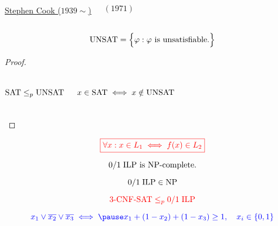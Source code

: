 \begin{frame}
  \begin{center}
  \end{center}

  \begin{columns}
	  \begin{center}
		\href{https://en.wikipedia.org/wiki/Stephen\_Cook}{Stephen Cook ($1939 \sim$)}
	  \end{center}
	  \begin{center}
		\href{http://www.cs.toronto.edu/~sacook/homepage/1971.pdf}{$(1971)$}
	  \end{center}
  \end{columns}
\end{frame}

\begin{frame}
  \[
	\text{UNSAT} = \Big\{ \varphi: \varphi \text{ is unsatisfiable.} \Big\}
  \]

  \begin{center}
  \end{center}

  \pause
  \begin{proof}
	\begin{columns}
		\pause
		\[
		  \text{SAT} \le_{p} \text{UNSAT}
		\]

		\pause
		\[
		  x \in \text{SAT} \iff x \notin \text{UNSAT}
		\]
		\pause
	\end{columns}
  \end{proof}

  \pause
  \[
	\textcolor{red}{\boxed{\forall x: x \in L_1 \iff f(x) \in L_2}}
  \]
\end{frame}

% 

\begin{frame}
  \begin{theorem}[CLRS $34.5$-$2$]
	\[
	  0/1\; \text{ILP}{} \text{ is NP-complete.}
	\]
  \end{theorem}

  \pause
  \[
	0/1\; \text{ILP}{} \in \text{NP}
  \]

  \pause
  \[
	\textcolor{red}{3\text{-CNF-SAT} \le_{p} 0/1\; \text{ILP}}
  \]

  \pause
  \[
	\blue{x_1 \lor \overline{x_2} \lor \overline{x_3} \iff \pause x_1 + (1-x_2) + (1-x_3) \ge 1, \quad x_i \in \set{0, 1}}
  \]
\end{frame}
